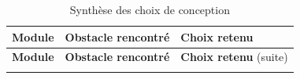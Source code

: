 \documentclass[11pt]{report}
\begin{document}
    \begin{xltabular}{\textwidth}{|l|X|X|}
        \caption{Synthèse des choix de conception} \label{tab:conception} \\
    
        \hline
        \textbf{Module} & \textbf{Obstacle rencontré} & \textbf{Choix retenu} \\
        \hline
        \endfirsthead
    
        \hline
        \textbf{Module} & \textbf{Obstacle rencontré} & \textbf{Choix retenu} (suite) \\
        \hline
        \endhead
    
        \hline
        \endfoot
        \hline
        \endlastfoot


\end{xltabular}
\end{document}
